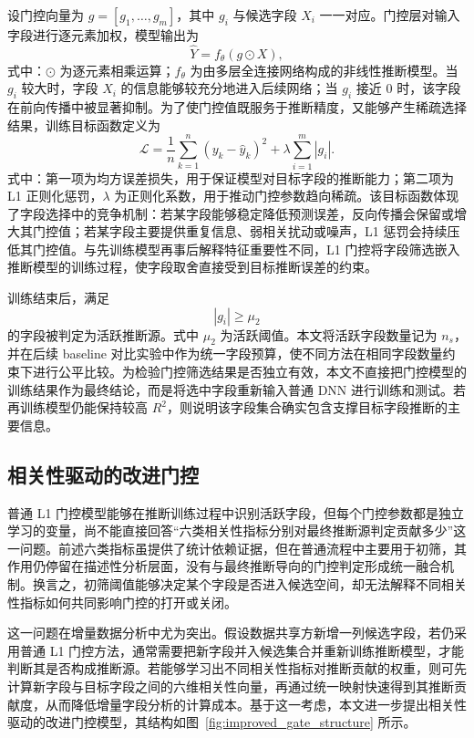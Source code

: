 \documentclass[UTF8,zihao=5,twoside]{ctexart}
\numberwithin{equation}{section}
\begin{document}
设门控向量为 $g=[g_1,\ldots,g_m]$，其中 $g_i$ 与候选字段 $X_i$ 一一对应。门控层对输入字段进行逐元素加权，模型输出为
\begin{equation}
\hat{Y}=f_{\theta}(g\odot X),
\end{equation}
式中：$\odot$ 为逐元素相乘运算；$f_{\theta}$ 为由多层全连接网络构成的非线性推断模型。当 $g_i$ 较大时，字段 $X_i$ 的信息能够较充分地进入后续网络；当 $g_i$ 接近 0 时，该字段在前向传播中被显著抑制。为了使门控值既服务于推断精度，又能够产生稀疏选择结果，训练目标函数定义为
\begin{equation}
\mathcal{L}=\frac{1}{n}\sum_{k=1}^{n}(y_k-\hat{y}_k)^2+\lambda\sum_{i=1}^{m}|g_i|.
\end{equation}
式中：第一项为均方误差损失，用于保证模型对目标字段的推断能力；第二项为 L1 正则化惩罚，$\lambda$ 为正则化系数，用于推动门控参数趋向稀疏。该目标函数体现了字段选择中的竞争机制：若某字段能够稳定降低预测误差，反向传播会保留或增大其门控值；若某字段主要提供重复信息、弱相关扰动或噪声，L1 惩罚会持续压低其门控值。与先训练模型再事后解释特征重要性不同，L1 门控将字段筛选嵌入推断模型的训练过程，使字段取舍直接受到目标推断误差的约束。

训练结束后，满足
\begin{equation}
|g_i|\geq \mu_2
\end{equation}
的字段被判定为活跃推断源。式中 $\mu_2$ 为活跃阈值。本文将活跃字段数量记为 $n_s$，并在后续 baseline 对比实验中作为统一字段预算，使不同方法在相同字段数量约束下进行公平比较。为检验门控筛选结果是否独立有效，本文不直接把门控模型的训练结果作为最终结论，而是将选中字段重新输入普通 DNN 进行训练和测试。若再训练模型仍能保持较高 $R^2$，则说明该字段集合确实包含支撑目标字段推断的主要信息。

\subsection{相关性驱动的改进门控}
普通 L1 门控模型能够在推断训练过程中识别活跃字段，但每个门控参数都是独立学习的变量，尚不能直接回答“六类相关性指标分别对最终推断源判定贡献多少”这一问题。前述六类指标虽提供了统计依赖证据，但在普通流程中主要用于初筛，其作用仍停留在描述性分析层面，没有与最终推断导向的门控判定形成统一融合机制。换言之，初筛阈值能够决定某个字段是否进入候选空间，却无法解释不同相关性指标如何共同影响门控的打开或关闭。

这一问题在增量数据分析中尤为突出。假设数据共享方新增一列候选字段，若仍采用普通 L1 门控方法，通常需要把新字段并入候选集合并重新训练推断模型，才能判断其是否构成推断源。若能够学习出不同相关性指标对推断贡献的权重，则可先计算新字段与目标字段之间的六维相关性向量，再通过统一映射快速得到其推断贡献度，从而降低增量字段分析的计算成本。基于这一考虑，本文进一步提出相关性驱动的改进门控模型，其结构如图~\ref{fig:improved_gate_structure} 所示。
\end{document}
